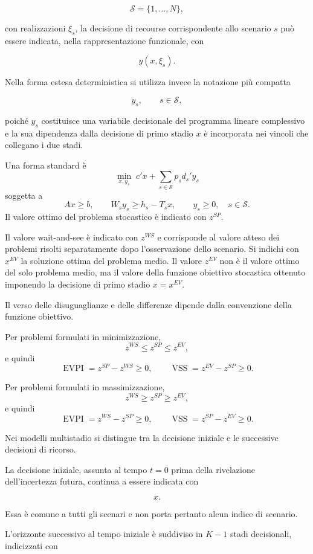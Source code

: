 \documentclass[12pt,a4paper]{article}
\newcommand{\1}{\mathbf{1}}
\newcommand{\EVPI}{\operatorname{EVPI}}
\newcommand{\VSS}{\operatorname{VSS}}
\begin{document}
\[
\mathcal S=\{1,\ldots,N\},
\]

con realizzazioni $\xi_s$, la decisione di recourse corrispondente allo
scenario $s$ pu\`o essere indicata, nella rappresentazione funzionale, con

\[
y(x,\xi_s).
\]

Nella forma estesa deterministica si utilizza invece la notazione pi\`u
compatta

\[
y_s,
\qquad
s\in\mathcal S,
\]

poich\'e $y_s$ costituisce una variabile decisionale del programma lineare
complessivo e la sua dipendenza dalla decisione di primo stadio $x$ \`e
incorporata nei vincoli che collegano i due stadi.

Una forma standard \`e
\[
\min_{x,y_s} \; c'x+\sum_{s\in\mathcal S}p_s d_s'y_s
\]
soggetta a
\[
Ax\geq b,
\qquad
W_s y_s\geq h_s-T_sx,
\qquad
y_s\geq0,
\quad s\in\mathcal S.
\]
Il valore ottimo del problema stocastico \`e indicato con $z^{SP}$.

Il valore wait-and-see \`e indicato con $z^{WS}$ e corrisponde al valore
atteso dei problemi risolti separatamente dopo l'osservazione dello scenario.
Si indichi con $x^{EV}$ la soluzione ottima del problema medio. Il valore
$z^{EV}$ non \`e il valore ottimo del solo problema medio, ma il valore della
funzione obiettivo stocastica ottenuto imponendo la decisione di primo stadio
$x=x^{EV}$.

Il verso delle disuguaglianze e delle differenze dipende dalla convenzione
della funzione obiettivo.

Per problemi formulati in minimizzazione,
\[
z^{WS}\leq z^{SP}\leq z^{EV},
\]
e quindi
\[
\EVPI=z^{SP}-z^{WS}\geq0,
\qquad
\VSS=z^{EV}-z^{SP}\geq0.
\]

Per problemi formulati in massimizzazione,
\[
z^{WS}\geq z^{SP}\geq z^{EV},
\]
e quindi
\[
\EVPI=z^{WS}-z^{SP}\geq0,
\qquad
\VSS=z^{SP}-z^{EV}\geq0.
\]

Nei modelli multistadio si distingue tra la decisione iniziale e le
successive decisioni di ricorso.

La decisione iniziale, assunta al tempo $t=0$ prima della rivelazione
dell'incertezza futura, continua a essere indicata con

\[
x.
\]

Essa \`e comune a tutti gli scenari e non porta pertanto alcun indice di
scenario.

L'orizzonte successivo al tempo iniziale \`e suddiviso in $K-1$ stadi
decisionali, indicizzati con
\end{document}

